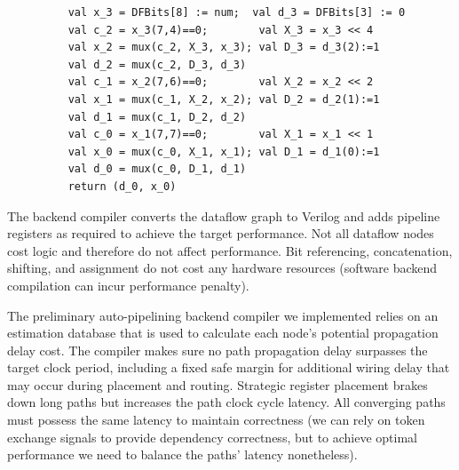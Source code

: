 \begin{figure}[h]
  \begin{verbatim}
	val x_3 = DFBits[8] := num;	 val d_3 = DFBits[3] := 0
	val c_2 = x_3(7,4)==0;        val X_3 = x_3 << 4
	val x_2 = mux(c_2, X_3, x_3); val D_3 = d_3(2):=1
	val d_2 = mux(c_2, D_3, d_3)
	val c_1 = x_2(7,6)==0;        val X_2 = x_2 << 2
	val x_1 = mux(c_1, X_2, x_2); val D_2 = d_2(1):=1
	val d_1 = mux(c_1, D_2, d_2)
	val c_0 = x_1(7,7)==0;        val X_1 = x_1 << 1
	val x_0 = mux(c_0, X_1, x_1); val D_1 = d_1(0):=1
	val d_0 = mux(c_0, D_1, d_1)
	return (d_0, x_0)
  \end{verbatim}
  \label{fig:LZC_unrolled_code}
\end{figure}

The backend compiler converts the dataflow graph to Verilog and adds pipeline registers as required to achieve the target performance.
Not all dataflow nodes cost logic and therefore do not affect performance. Bit referencing, concatenation, shifting, and assignment do not cost any hardware resources (software backend compilation can incur performance  penalty). 

The preliminary auto-pipelining backend compiler we implemented relies on an estimation database that is used to calculate each node's potential propagation delay cost. The compiler makes sure no path propagation delay surpasses the target clock period, including a fixed safe margin for additional wiring delay that may occur during placement and routing. Strategic register placement brakes down long paths but increases the path clock cycle latency. All converging paths must possess the same latency to maintain correctness (we can rely on token exchange signals to provide dependency correctness, but to achieve optimal performance we need to balance the paths' latency nonetheless).

